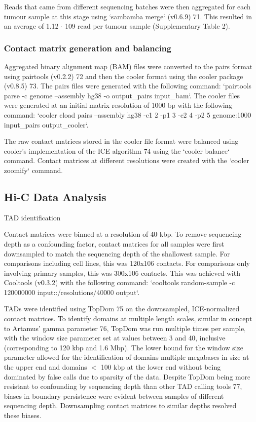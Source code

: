 Reads that came from different sequencing batches were then aggregated for each tumour sample at this stage using `sambamba merge` (v0.6.9) 71.
This resulted in an average of 1.12 $\cdot$ 109 read per tumour sample (Supplementary Table 2).

\subsubsection{Contact matrix generation and balancing}

Aggregated binary alignment map (BAM) files were converted to the pairs format using pairtools (v0.2.2) 72 and then the cooler format using the cooler package (v0.8.5) 73.
The pairs files were generated with the following command: `pairtools parse -c {genome} --assembly hg38 -o {output_pairs} {input_bam}`.
The cooler files were generated at an initial matrix resolution of 1000 bp with the following command: `cooler cload pairs --assembly hg38 -c1 2 -p1 3 -c2 4 -p2 5 {genome}:1000 {input_pairs} {output_cooler}`.

The raw contact matrices stored in the cooler file format were balanced using cooler's implementation of the ICE algorithm 74 using the `cooler balance` command.
Contact matrices at different resolutions were created with the `cooler zoomify` command.

\subsection{Hi-C Data Analysis}

TAD identification

Contact matrices were binned at a resolution of 40 kbp.
To remove sequencing depth as a confounding factor, contact matrices for all samples were first downsampled to match the sequencing depth of the shallowest sample.
For comparisons including cell lines, this was 120x106 contacts.
For comparisons only involving primary samples, this was 300x106 contacts.
This was achieved with Cooltools (v0.3.2) with the following command: `cooltools random-sample -c 120000000 {input}::/resolutions/40000 {output}`.

TADs were identified using TopDom 75 on the downsampled, ICE-normalized contact matrices.
To identify domains at multiple length scales, similar in concept to Artamus' gamma parameter 76, TopDom was run multiple times per sample, with the window size parameter set at values between 3 and 40, inclusive (corresponding to 120 kbp and 1.6 Mbp).
The lower bound for the window size parameter allowed for the identification of domains multiple megabases in size at the upper end and domains $<$ 100 kbp at the lower end without being dominated by false calls due to sparsity of the data.
Despite TopDom being more resistant to confounding by sequencing depth than other TAD calling tools 77, biases in boundary persistence were evident between samples of different sequencing depth.
Downsampling contact matrices to similar depths resolved these biases.


